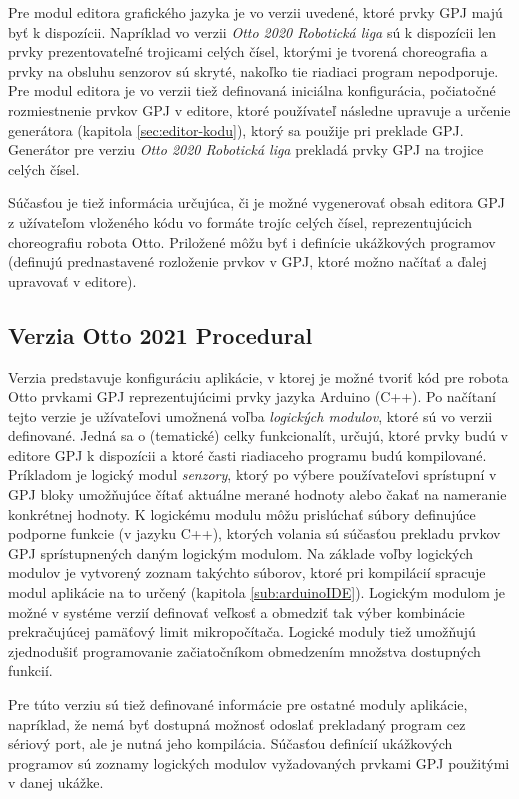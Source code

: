 Pre modul editora grafického jazyka je vo verzii uvedené, ktoré prvky GPJ majú byť k dispozícii. Napríklad vo verzii \textit{Otto 2020 Robotická liga} sú k dispozícii len prvky prezentovateľné trojicami celých čísel, ktorými je tvorená choreografia a prvky na obsluhu senzorov sú skryté, nakoľko tie riadiaci program nepodporuje. Pre modul editora je vo verzii tiež definovaná iniciálna konfigurácia, počiatočné rozmiestnenie prvkov GPJ v editore, ktoré používateľ následne upravuje a určenie generátora (kapitola \ref{sec:editor-kodu}), ktorý sa použije pri preklade GPJ. Generátor pre verziu \textit{Otto 2020 Robotická liga} prekladá prvky GPJ na trojice celých čísel.

Súčasťou je tiež informácia určujúca, či je možné vygenerovať obsah editora GPJ z užívateľom vloženého kódu vo formáte trojíc celých čísel, reprezentujúcich choreografiu robota Otto. Priložené môžu byť i definície ukážkových programov (definujú prednastavené rozloženie prvkov v GPJ, ktoré možno načítať a ďalej upravovať v editore).

\subsection{Verzia Otto 2021 Procedural}
Verzia  predstavuje konfiguráciu aplikácie, v ktorej je možné tvoriť kód pre robota Otto prvkami GPJ reprezentujúcimi prvky jazyka Arduino (C++). Po načítaní tejto verzie je užívateľovi umožnená voľba \textit{logických modulov}, ktoré sú vo verzii definované. Jedná sa o (tematické) celky funkcionalít, určujú, ktoré prvky budú v editore GPJ k dispozícii a ktoré časti riadiaceho programu budú kompilované. Príkladom je logický modul \textit{senzory}, ktorý po výbere používateľovi sprístupní v GPJ bloky umožňujúce čítať aktuálne merané hodnoty alebo čakať na nameranie konkrétnej hodnoty. K logickému modulu môžu prislúchať súbory definujúce podporne funkcie (v jazyku C++), ktorých volania sú súčasťou prekladu prvkov GPJ sprístupnených daným logickým modulom. Na základe voľby logických modulov je vytvorený zoznam takýchto súborov, ktoré pri kompilácií spracuje modul aplikácie na to určený (kapitola \ref{sub:arduinoIDE}). Logickým modulom je možné v systéme verzií definovať veľkosť a obmedziť tak výber kombinácie prekračujúcej pamäťový limit mikropočítača. Logické moduly tiež umožňujú zjednodušiť programovanie začiatočníkom obmedzením množstva dostupných funkcií.

Pre túto verziu sú tiež definované informácie pre ostatné moduly aplikácie, napríklad, že nemá byť dostupná možnosť odoslať prekladaný program cez sériový port, ale je nutná jeho kompilácia. Súčasťou definícií ukážkových programov sú zoznamy logických modulov vyžadovaných prvkami GPJ použitými v danej ukážke.


